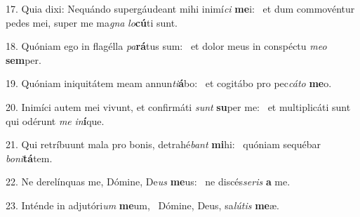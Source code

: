 17. Quia dixi: Nequándo supergáudeant mihi inimí\textit{ci} \textbf{me}i: \ast\  et dum commovéntur pedes mei, super me ma\textit{gna} \textit{lo}\textbf{cú}ti sunt.\

18. Quóniam ego in flagélla \textit{pa}\textbf{rá}tus sum: \ast\  et dolor meus in conspéctu \textit{me}\textit{o} \textbf{sem}per.\

19. Quóniam iniquitátem meam annun\textit{ti}\textbf{á}bo: \ast\  et cogitábo pro pec\textit{cá}\textit{to} \textbf{me}o.\

20. Inimíci autem mei vivunt, et confirmáti \textit{sunt} \textbf{su}per me: \ast\  et multiplicáti sunt qui odérunt \textit{me} \textit{in}\textbf{í}que.\

21. Qui retríbuunt mala pro bonis, detrahé\textit{bant} \textbf{mi}hi: \ast\  quóniam sequébar \textit{bo}\textit{ni}\textbf{tá}tem.\

22. Ne derelínquas me, Dómine, De\textit{us} \textbf{me}us: \ast\  ne discés\textit{se}\textit{ris} \textbf{a} me.\

23. Inténde in adjutóri\textit{um} \textbf{me}um, \ast\  Dómine, Deus, sa\textit{lú}\textit{tis} \textbf{me}æ.\

